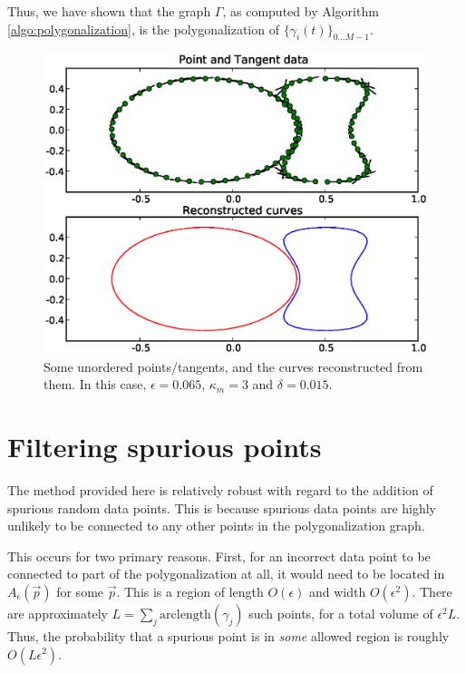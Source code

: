 \documentclass{article}
\numberwithin{cntr}{section}
\numberwithin{equation}{section}
\newcommand{\vp}[0]{{\vec{p}}}
\newcommand{\Oto}[1]{{0 \ldots #1-1}}
\newcommand{\curveSet}{{ \{ \gamma_i(t) \}_{\Oto{M}}}}
\newcommand{\allowed}[2]{ { A_{#1}(#2) } }
\newcommand{\curvemax}{{\kappa_{m}}}
\begin{document}
Thus, we have shown that the graph $\Gamma$, as computed by Algorithm \ref{algo:polygonalization}, is the polygonalization of $\curveSet$.

\begin{figure}
\setlength{\unitlength}{0.240900pt}
\ifx\plotpoint\undefined\newsavebox{\plotpoint}\fi
\sbox{\plotpoint}{\rule[-0.200pt]{0.400pt}{0.400pt}}%
\includegraphics[scale=0.5]{example1.eps}

\caption{Some unordered points/tangents, and the curves reconstructed from them. In this case, $\epsilon=0.065$, $\curvemax=3$ and $\delta=0.015$.}
\label{fig:basicExample}
\end{figure}

\section{Filtering spurious points}

The method provided here is relatively robust with regard to the addition of spurious random data points. This is because spurious data points are highly unlikely to be connected to any other points in the polygonalization graph.

This occurs for two primary reasons. First, for an incorrect data point to be connected to part of the polygonalization at all, it would need to be located in $\allowed{\epsilon}{\vp}$ for some $\vp$. This is a region of length $O(\epsilon)$ and width $O(\epsilon^{2})$. There are approximately $L = \sum_{j} \textrm{arclength}(\gamma_{j})$ such points, for a total volume of $\epsilon^{2} L$. Thus, the probability that a spurious point is in \emph{some} allowed region is roughly $O(L \epsilon^{2})$.
\end{document}

